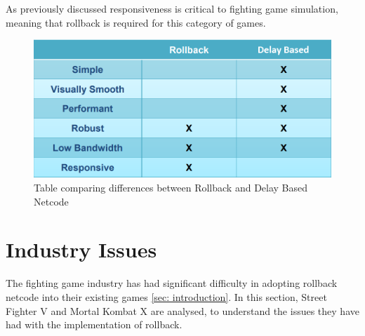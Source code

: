 \documentclass{entcs}
\begin{document}
As previously discussed responsiveness is critical to fighting game simulation, meaning that rollback is required for this category of games.
\begin{figure}[H]
\centering
\includegraphics[width=\textwidth]{NetcodeCompare}
\caption{Table comparing differences between Rollback and Delay Based Netcode\cite{8Frames}}
\label{fig:NetcodeCompare}
\end{figure}


\section{Industry Issues}
The fighting game industry has had significant difficulty in adopting rollback netcode into their existing games \ref{sec: introduction}. In this section, Street Fighter V and Mortal Kombat X are analysed, to understand the issues they have had with the implementation of rollback.
\end{document}
